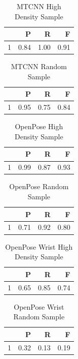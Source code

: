 \documentclass[10pt, letterpaper]{article}
\begin{document}
\begin{table}[H]
\centering
\begin{tabular}{rrrr}
  \hline
 & P & R & F \\ 
  \hline
1 & 0.84 & 1.00 & 0.91 \\ 
   \hline
\end{tabular}
\caption{MTCNN High Density Sample} 
\end{table}\begin{table}[H]
\centering
\begin{tabular}{rrrr}
  \hline
 & P & R & F \\ 
  \hline
1 & 0.95 & 0.75 & 0.84 \\ 
   \hline
\end{tabular}
\caption{MTCNN Random Sample} 
\end{table}\begin{table}[H]
\centering
\begin{tabular}{rrrr}
  \hline
 & P & R & F \\ 
  \hline
1 & 0.99 & 0.87 & 0.93 \\ 
   \hline
\end{tabular}
\caption{OpenPose High Density Sample} 
\end{table}\begin{table}[H]
\centering
\begin{tabular}{rrrr}
  \hline
 & P & R & F \\ 
  \hline
1 & 0.71 & 0.92 & 0.80 \\ 
   \hline
\end{tabular}
\caption{OpenPose Random Sample} 
\end{table}\begin{table}[H]
\centering
\begin{tabular}{rrrr}
  \hline
 & P & R & F \\ 
  \hline
1 & 0.65 & 0.85 & 0.74 \\ 
   \hline
\end{tabular}
\caption{OpenPose Wrist High Density Sample} 
\end{table}\begin{table}[H]
\centering
\begin{tabular}{rrrr}
  \hline
 & P & R & F \\ 
  \hline
1 & 0.32 & 0.13 & 0.19 \\ 
   \hline
\end{tabular}
\caption{OpenPose Wrist Random Sample} 
\end{table}\begin{table}[H]

\end{table}
\end{document}
